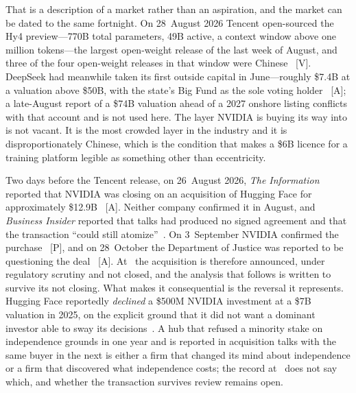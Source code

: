 That is a description of a market rather than an aspiration, and the market can be dated to the same fortnight. On 28~August 2026 Tencent open-sourced the Hy4 preview---770B total parameters, 49B active, a context window above one million tokens---the largest open-weight release of the last week of August, and three of the four open-weight releases in that window were Chinese~\cite{hunyuan-hy4} [V]. DeepSeek had meanwhile taken its first outside capital in June---roughly \$7.4B at a valuation above \$50B, with the state's Big Fund as the sole voting holder~\cite{deepseek-round} [A]; a late-August report of a \$74B valuation ahead of a 2027 onshore listing conflicts with that account and is not used here. The layer NVIDIA is buying its way into is not vacant. It is the most crowded layer in the industry and it is disproportionately Chinese, which is the condition that makes a \$6B licence for a training platform legible as something other than eccentricity.

Two days before the Tencent release, on 26~August 2026, \emph{The Information} reported that NVIDIA was closing on an acquisition of Hugging Face for approximately \$12.9B~\cite{nvda-hf} [A]. Neither company confirmed it in August, and \emph{Business Insider} reported that talks had produced no signed agreement and that the transaction ``could still atomize''~\cite{nvda-hf}. On 3~September NVIDIA confirmed the purchase~\cite{mdl-nvda-hf-confirm} [P], and on 28~October the Department of Justice was reported to be questioning the deal~\cite{mdl-doj-hf} [A]. At \datafreeze\ the acquisition is therefore announced, under regulatory scrutiny and not closed, and the analysis that follows is written to survive its not closing. What makes it consequential is the reversal it represents. Hugging Face reportedly \emph{declined} a \$500M NVIDIA investment at a \$7B valuation in 2025, on the explicit ground that it did not want a dominant investor able to sway its decisions~\cite{nvda-hf}. A hub that refused a minority stake on independence grounds in one year and is reported in acquisition talks with the same buyer in the next is either a firm that changed its mind about independence or a firm that discovered what independence costs; the record at \datafreeze\ does not say which, and whether the transaction survives review remains open.

